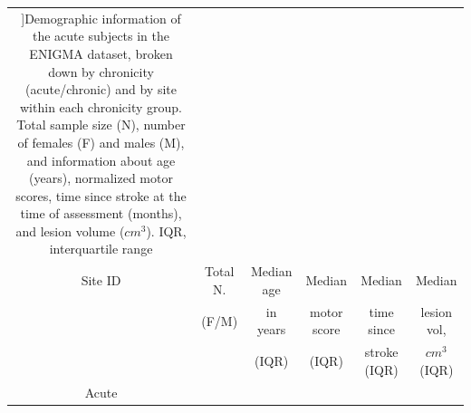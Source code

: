 \documentclass[phd,tocprelim]{cornell}
\renewcommand{\caption}[1]{\singlespacing\hangcaption{#1}\normalspacing}
\begin{document}
\singlespacing
\begin{longtable}{c|c|c|c|c|c}
\caption[]{Demographic information of the acute subjects in the ENIGMA dataset, broken down by chronicity (acute/chronic) and by site within each chronicity group. Total sample size (N), number of females (F) and males (M), and information about age (years), normalized motor scores, time since stroke at the time of assessment (months), and lesion volume ($cm^3$). IQR, interquartile range\label{Demographics}}\\

Site ID & Total N.  & Median age & Median   & Median   & Median  \\
& (F/M) & in years & motor score&  time since  & lesion vol,  \\
& &(IQR)  &  (IQR) & stroke (IQR)  & $cm^3$ (IQR)  \\
Acute & & & & & \\


\end{longtable}
\end{document}
